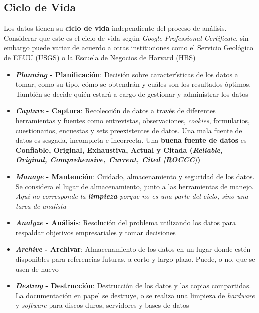 \subsection{Ciclo de Vida}
Los datos tienen su \textbf{ciclo de vida} independiente del proceso de análisis. Considerar que este es el ciclo de vida según \textit{Google Professional Certificate}, sin embargo puede variar de acuerdo a otras instituciones como el \href{https://www.usgs.gov/data-management/data-lifecycle}{Servicio Geológico de EEUU (USGS)} o la \href{https://online.hbs.edu/blog/post/data-life-cycle}{Escuela de Negocios de Harvard (HBS)}
\begin{itemize}
    \item {\textbf{\textit{Planning} - Planificación}: Decisión sobre características de los datos a tomar, como su tipo, cómo se obtendrán y cuáles son los resultados óptimos. También se decide quién estará a cargo de gestionar y administrar los datos}
    \item {\textbf{\textit{Capture} - Captura}: Recolección de datos a través de diferentes herramientas y fuentes como entrevistas, observaciones, \textit{cookies}, formularios, cuestionarios, encuestas y sets preexistentes de datos. Una mala fuente de datos es sesgada, incompleta e incorrecta. Una \textbf{buena fuente de datos} es \textbf{Confiable, Original, Exhaustiva, Actual y Citada (\textit{Reliable, Original, Comprehensive, Current, Cited [ROCCC]})}}
    \item {\textbf{\textit{Manage} - Mantención}: Cuidado, almacenamiento y seguridad de los datos. Se considera el lugar de almacenamiento, junto a las herramientas de manejo. \textit{Aquí no corresponde la \textbf{limpieza} porque no es una parte del ciclo, sino una tarea de analista}}
    \item {\textbf{\textit{Analyze} - Análisis}: Resolución del problema utilizando los datos para respaldar objetivos empresariales y tomar decisiones}
    \item {\textbf{\textit{Archive} - Archivar}: Almacenamiento de los datos en un lugar donde estén disponibles para referencias futuras, a corto y largo plazo. Puede, o no, que se usen de nuevo}
    \item {\textbf{\textit{Destroy} - Destrucción}: Destrucción de los datos y las copias compartidas. La documentación en papel se destruye, o se realiza una limpieza de \textit{hardware} y \textit{software} para discos duros, servidores y bases de datos}
\end{itemize}

